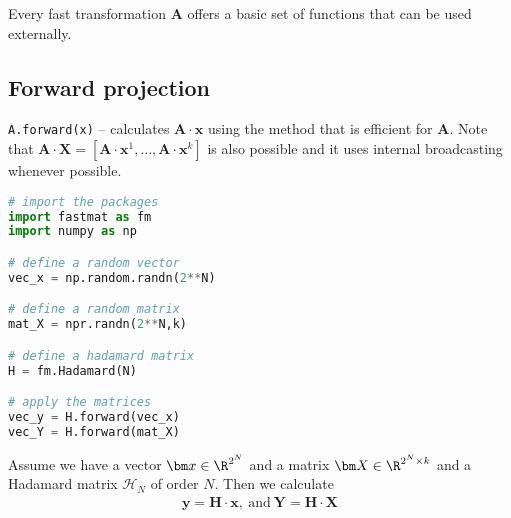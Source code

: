 %
%
%  
%
%
%
%

Every fast transformation $\bm A$ offers a basic set of functions that can be used externally.

\subsection{Forward projection}
\texttt{A.forward(x)} -- calculates $\bm A \cdot \bm x$ using the method that is efficient for $\bm A$. Note that $\bm A \cdot \bm X = [\bm A \cdot \bm x^1,\dots,\bm A \cdot \bm x^k]$ is also possible and it uses \np{} internal broadcasting whenever possible.

\begin{snippet}
\begin{lstlisting}[language=Python]
# import the packages
import fastmat as fm
import numpy as np

# define a random vector
vec_x = np.random.randn(2**N)

# define a random matrix
mat_X = npr.randn(2**N,k)

# define a hadamard matrix
H = fm.Hadamard(N)

# apply the matrices
vec_y = H.forward(vec_x)
vec_Y = H.forward(mat_X)
\end{lstlisting}

Assume we have a vector $\bm x \in \R^{2^N}$ and a matrix $\bm X \in \R^{2^N \times k}$ and a Hadamard matrix $\bm{\mathcal{H}}_N$ of order $N$. Then we calculate
\begin{align}
\bm y = \bm H \cdot \bm x, ~ \mathrm{and} ~ \bm Y = \bm H \cdot \bm X
\end{align}
\end{snippet}

